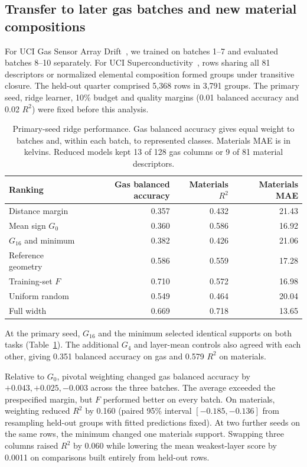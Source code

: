 \subsection{Transfer to later gas batches and new material compositions}
For UCI Gas Sensor Array Drift~\citep{vergara2012gas}, we trained on batches 1--7 and evaluated batches 8--10 separately. For UCI Superconductivity~\citep{hamidieh2018}, rows sharing all 81 descriptors or normalized elemental composition formed groups under transitive closure. The held-out quarter comprised 5,368 rows in 3,791 groups. The primary seed, ridge learner, 10\% budget and quality margins (0.01 balanced accuracy and 0.02 $R^2$) were fixed before this analysis.

\begin{table}[tb]
\centering\small
\caption{Primary-seed ridge performance. Gas balanced accuracy gives equal weight to batches and, within each batch, to represented classes. Materials MAE is in kelvins. Reduced models kept 13 of 128 gas columns or 9 of 81 material descriptors.}
\label{tab:newcohorts}
\begin{tabular}{@{}lrrr@{}}\toprule
Ranking & Gas balanced accuracy & Materials $R^2$ & Materials MAE\\\midrule
Distance margin       & 0.357 & 0.432 & 21.43\\
Mean sign $G_0$       & 0.360 & 0.586 & 16.92\\
$G_{16}$ and minimum  & 0.382 & 0.426 & 21.06\\
Reference geometry    & 0.586 & 0.559 & 17.28\\
Training-set $F$      & 0.710 & 0.572 & 16.98\\
Uniform random        & 0.549 & 0.464 & 20.04\\
Full width            & 0.669 & 0.718 & 13.65\\\bottomrule
\end{tabular}
\end{table}

At the primary seed, $G_{16}$ and the minimum selected identical supports on both tasks (Table~\ref{tab:newcohorts}). The additional $G_4$ and layer-mean controls also agreed with each other, giving 0.351 balanced accuracy on gas and 0.579 $R^2$ on materials.

Relative to $G_0$, pivotal weighting changed gas balanced accuracy by $+0.043,+0.025,-0.003$ across the three batches. The average exceeded the prespecified margin, but $F$ performed better on every batch. On materials, weighting reduced $R^2$ by 0.160 (paired 95\% interval $[-0.185,-0.136]$ from resampling held-out groups with fitted predictions fixed). At two further seeds on the same rows, the minimum changed one materials support. Swapping three columns raised $R^2$ by 0.060 while lowering the mean weakest-layer score by 0.0011 on comparisons built entirely from held-out rows.
